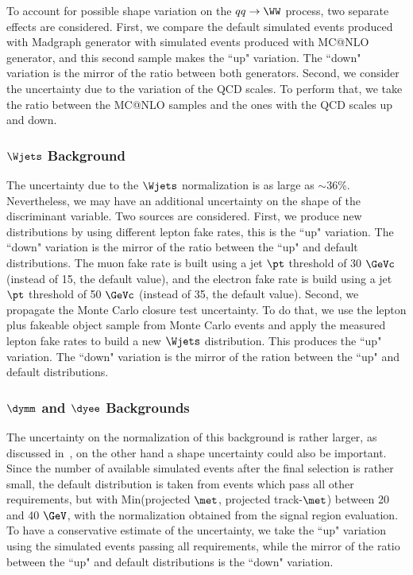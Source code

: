 To account for possible shape variation on the $qq \to \WW$ process, two 
separate effects are considered. First, we compare the default simulated events
produced with Madgraph generator with simulated events produced with MC@NLO
generator, and this second sample makes the ``up" variation. The ``down"
variation is the mirror of the ratio between both generators. Second, we consider
the uncertainty due to the variation of the QCD scales. To perform that, we take
the ratio between the MC@NLO samples and the ones with the QCD scales up and down.

\subsubsection{$\Wjets$ Background}
The uncertainty due to the $\Wjets$ normalization is as large as $\sim$36\%.
Nevertheless, we may have an additional uncertainty on the shape of the
discriminant variable. Two sources are considered. First, we produce new
distributions by using different lepton fake rates, this is the ``up" variation.
The ``down" variation is the mirror of the ratio between the ``up" and default
distributions. The muon fake rate is built using a jet $\pt$ threshold of 30
$\GeVc$ (instead of 15, the default value), and the electron fake rate is build
using a jet $\pt$ threshold of 50 $\GeVc$ (instead of 35, the default value).
Second, we propagate the Monte Carlo closure test uncertainty. To do that, we use
the lepton plus fakeable object sample from Monte Carlo events and apply 
the measured lepton fake rates to build a new $\Wjets$ distribution. This
produces the ``up" variation. The ``down" variation is the mirror of the ration
between the ``up" and default distributions.

\subsubsection{$\dymm$ and $\dyee$ Backgrounds}
The uncertainty on the normalization of this background is rather larger, as
discussed in~\cite{hww_eps}, on the other hand a shape uncertainty could also be
important. Since the number of available simulated events after the final
selection is rather small, the default distribution is taken from events which 
pass all other requirements, but with Min(projected $\met$, projected
track-$\met$) between 20 and 40 $\GeV$, with the normalization obtained from the
signal region evaluation. To have a conservative estimate of the
uncertainty, we take the ``up" variation using the simulated events passing all
requirements, while the mirror of the ratio between the ``up" and default
distributions is the ``down" variation.

